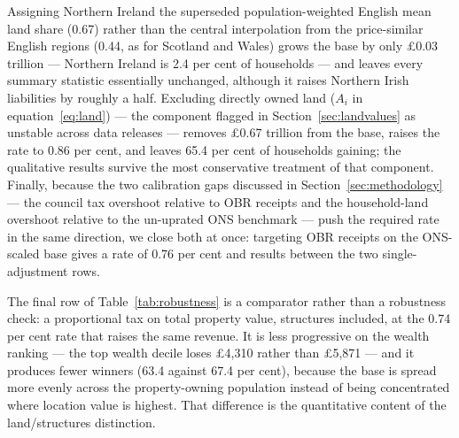 Assigning Northern Ireland the superseded population-weighted English mean land share (0.67) rather than the central interpolation from the price-similar English regions (0.44, as for Scotland and Wales) grows the base by only \pounds 0.03 trillion --- Northern Ireland is 2.4 per cent of households --- and leaves every summary statistic essentially unchanged, although it raises Northern Irish liabilities by roughly a half. Excluding directly owned land ($A_i$ in equation~\ref{eq:land}) --- the component flagged in Section~\ref{sec:landvalues} as unstable across data releases --- removes \pounds 0.67 trillion from the base, raises the rate to 0.86 per cent, and leaves 65.4 per cent of households gaining; the qualitative results survive the most conservative treatment of that component. Finally, because the two calibration gaps discussed in Section~\ref{sec:methodology} --- the council tax overshoot relative to OBR receipts and the household-land overshoot relative to the un-uprated ONS benchmark --- push the required rate in the same direction, we close both at once: targeting OBR receipts on the ONS-scaled base gives a rate of 0.76 per cent and results between the two single-adjustment rows.

The final row of Table~\ref{tab:robustness} is a comparator rather than a robustness check: a proportional tax on total property value, structures included, at the 0.74 per cent rate that raises the same revenue. It is less progressive on the wealth ranking --- the top wealth decile loses \pounds 4{,}310 rather than \pounds 5{,}871 --- and it produces fewer winners (63.4 against 67.4 per cent), because the base is spread more evenly across the property-owning population instead of being concentrated where location value is highest. That difference is the quantitative content of the land/structures distinction.

